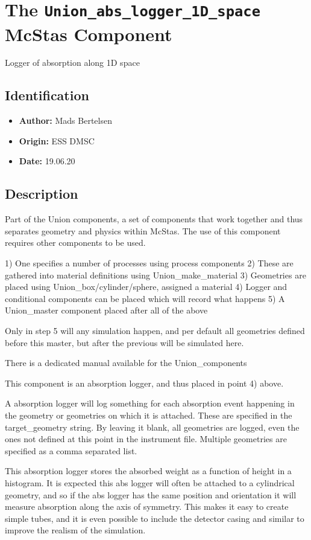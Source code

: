 \section{The \texttt{Union\_abs\_logger\_1D\_space} McStas Component}
Logger of absorption along 1D space

\subsection*{Identification}
\begin{itemize}
  \item \textbf{Author:} Mads Bertelsen
  \item \textbf{Origin:} ESS DMSC
  \item \textbf{Date:} 19.06.20
\end{itemize}

\subsection*{Description}
Part of the Union components, a set of components that work together and thus separates geometry and physics within McStas. The use of this component requires other components to be used.

1) One specifies a number of processes using process components 2) These are gathered into material definitions using Union\_make\_material 3) Geometries are placed using Union\_box/cylinder/sphere, assigned a material 4) Logger and conditional components can be placed which will record what happens 5) A Union\_master component placed after all of the above

Only in step 5 will any simulation happen, and per default all geometries defined before this master, but after the previous will be simulated here.

There is a dedicated manual available for the Union\_components

This component is an absorption logger, and thus placed in point 4) above.

A absorption logger will log something for each absorption event happening in the geometry or geometries on which it is attached. These are specified in the target\_geometry string. By leaving it blank, all geometries are logged, even the ones not defined at this point in the instrument file. Multiple geometries are specified as a comma separated list.

This absorption logger stores the absorbed weight as a function of height in a histogram. It is expected this abs logger will often be attached to a cylindrical geometry, and so if the abs logger has the same position and orientation it will measure absorption along the axis of symmetry. This makes it easy to create simple tubes, and it is even possible to include the detector casing and similar to improve the realism of the simulation.

